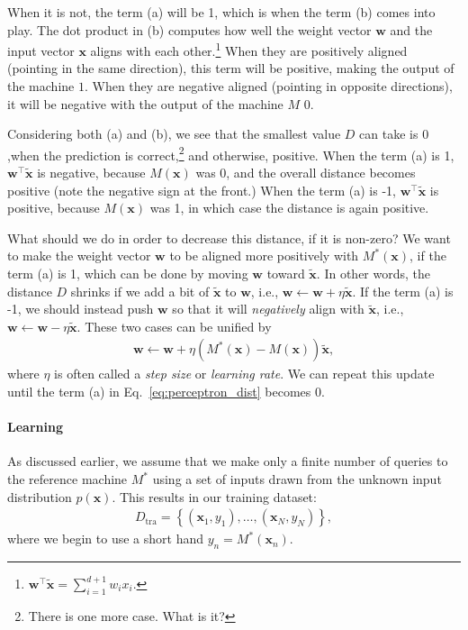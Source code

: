 \documentclass{report}
\newcommand{\vect}[1]{\mathbf{#1}}
\newcommand{\vx}[0]{\vect{x}}
\newcommand{\vw}[0]{\vect{w}}
\begin{document}
When it is not, the term (a) will be 1, which is when the term (b) comes into
play. The dot product in (b) computes how well the weight vector $\vw$ and the
input vector $\vx$ aligns with each other.\footnote{
    $\vw^\top \tilde{\vx} = \sum_{i=1}^{d+1} w_i x_i$.
} When they are positively aligned (pointing in the same direction), this term
will be positive, making the output of the machine $1$. When they are negative
aligned (pointing in opposite directions), it will be negative with the output
of the machine $M$ $0$.

Considering both (a) and (b), we see that the smallest value $D$ can take is $0$
,when the prediction is correct,\footnote{
    There is one more case. What is it?
} and otherwise, positive. When the term (a) is 1, $\vw^\top \tilde{\vx}$ is
negative, because $M(\vx)$ was 0, and the overall distance becomes positive
(note the negative sign at the front.) When the term (a) is -1, $\vw^\top
\tilde{\vx}$ is positive, because $M(\vx)$ was 1, in which case the distance is
again positive. 

What should we do in order to decrease this distance, if it is non-zero? We want
to make the weight vector $\vw$ to be aligned more positively with $M^*(\vx)$,
if the term (a) is 1, which can be done by moving $\vw$ toward $\tilde{\vx}$. In
other words, the distance $D$ shrinks if we add a bit of $\tilde{\vx}$ to $\vw$,
i.e., $\vw \leftarrow \vw + \eta \tilde{\vx}$. If the term (a) is -1, we should
instead push $\vw$ so that it will {\it negatively} align with $\tilde{\vx}$,
i.e., $\vw \leftarrow \vw - \eta \tilde{\vx}$. These two cases can be unified by
\begin{align}
    \label{eq:perceptron_rule0}
    \vw \leftarrow \vw + \eta \left( M^*(\vx) - M(\vx)\right) \tilde{\vx},
\end{align}
where $\eta$ is often called a {\it step size} or {\it learning rate}.  We can
repeat this update until the term (a) in Eq.~\eqref{eq:perceptron_dist} becomes
0. 

\paragraph{Learning}

As discussed earlier, we assume that we make only a finite number of queries to
the reference machine $M^*$ using a set of inputs drawn from the unknown input
distribution $p(\vx)$. This results in our training dataset:
\begin{align*}
    D_{\text{tra}} = \left\{ (\vx_1, y_1), \ldots, (\vx_N, y_N) \right\},
\end{align*}
where we begin to use a short hand $y_n=M^*(\vx_n)$.
\end{document}
